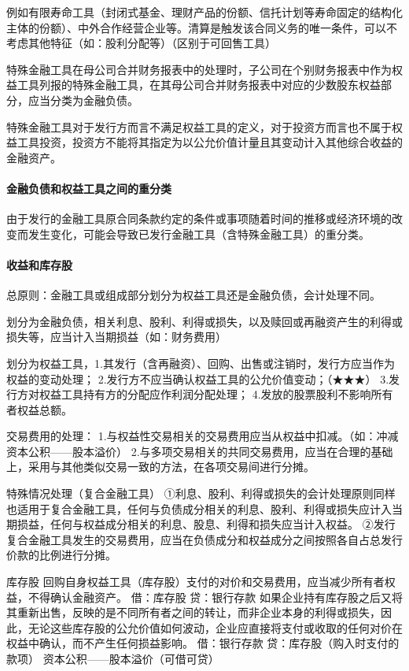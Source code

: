 \documentclass[UTF8,12pt]{ctexart}
\numberwithin{equation}{section} %
\numberwithin{figure}{section}
\numberwithin{table}{section}
\begin{document}
	例如有限寿命工具（封闭式基金、理财产品的份额、信托计划等寿命固定的结构化主体的份额）、中外合作经营企业等。清算是触发该合同义务的唯一条件，可以不考虑其他特征（如：股利分配等）（区别于可回售工具）
	
	特殊金融工具在母公司合并财务报表中的处理时，子公司在个别财务报表中作为权益工具列报的特殊金融工具，在其母公司合并财务报表中对应的少数股东权益部分，应当分类为金融负债。
	
	特殊金融工具对于发行方而言不满足权益工具的定义，对于投资方而言也不属于权益工具投资，投资方不能将其指定为以公允价值计量且其变动计入其他综合收益的金融资产。
	
	\paragraph{金融负债和权益工具之间的重分类}
	由于发行的金融工具原合同条款约定的条件或事项随着时间的推移或经济环境的改变而发生变化，可能会导致已发行金融工具（含特殊金融工具）的重分类。
	
	\paragraph{收益和库存股}
	总原则：金融工具或组成部分划分为权益工具还是金融负债，会计处理不同。
	
	划分为金融负债，相关利息、股利、利得或损失，以及赎回或再融资产生的利得或损失等，应当计入当期损益（如：财务费用） 
	
	划分为权益工具，1.其发行（含再融资）、回购、出售或注销时，发行方应当作为权益的变动处理；
	2.发行方不应当确认权益工具的公允价值变动；（★★★）
	3.发行方对权益工具持有方的分配应作利润分配处理；
	4.发放的股票股利不影响所有者权益总额。
	
	交易费用的处理：
	1.与权益性交易相关的交易费用应当从权益中扣减。（如：冲减资本公积——股本溢价） 
	2.与多项交易相关的共同交易费用，应当在合理的基础上，采用与其他类似交易一致的方法，在各项交易间进行分摊。
	
	特殊情况处理（复合金融工具）
	①利息、股利、利得或损失的会计处理原则同样也适用于复合金融工具，任何与负债成分相关的利息、股利、利得或损失应计入当期损益，任何与权益成分相关的利息、股息、利得和损失应当计入权益。
	②发行复合金融工具发生的交易费用，应当在负债成分和权益成分之间按照各自占总发行价款的比例进行分摊。
	
	库存股
	回购自身权益工具（库存股）支付的对价和交易费用，应当减少所有者权益，不得确认金融资产。
	借：库存股
	贷：银行存款
	如果企业持有库存股之后又将其重新出售，反映的是不同所有者之间的转让，而非企业本身的利得或损失，因此，无论这些库存股的公允价值如何波动，企业应直接将支付或收取的任何对价在权益中确认，而不产生任何损益影响。
	借：银行存款
	贷：库存股（购入时支付的款项）
	资本公积——股本溢价（可借可贷）
	
\end{document}
